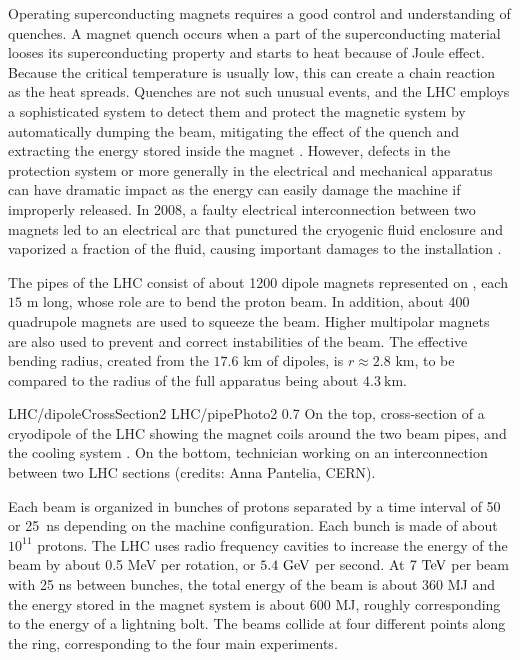     Operating superconducting magnets requires a good control and understanding
    of quenches.  A magnet quench occurs when a part of the superconducting
    material looses its superconducting property and starts to heat because of
    Joule effect. Because the critical temperature is usually low, this can
    create a chain reaction as the heat spreads. Quenches are not such unusual
    events, and the LHC employs a sophisticated system to detect them and
    protect the magnetic system by automatically dumping the beam, mitigating
    the effect of the quench and extracting the energy stored inside the magnet
    \cite{LHCmagnets}.  However, defects in the protection system or more
    generally in the electrical and mechanical apparatus can have dramatic
    impact as the energy can easily damage the machine if improperly released.
    In 2008, a faulty electrical interconnection between two magnets led to an
    electrical arc that punctured the cryogenic fluid enclosure and vaporized a
    fraction of the fluid, causing important damages to the installation
    \cite{LHCindicent}.

    The pipes of the LHC consist of about 1200 dipole magnets represented on
    , each $15$ m long, whose role are to bend the proton
    beam.  In addition, about 400 quadrupole magnets are used to squeeze the
    beam. Higher multipolar magnets are also used to prevent and correct
    instabilities of the beam. The effective bending radius, created from the
    $17.6$ km of dipoles, is $r \approx 2.8$ km, to be compared to the radius of
    the full apparatus being about $4.3~\text{km}$.

                     {LHC/dipoleCrossSection2}
                     {LHC/pipePhoto2}
                     {0.7}
                     {On the top, cross-section of a cryodipole of the LHC
                     showing the magnet coils around the two beam pipes, and the
                     cooling system \cite{LHC}.  On the bottom, technician
                     working on an interconnection between two LHC sections
                     (credits: Anna Pantelia, CERN).}

    Each beam is organized in bunches of protons separated by a time interval of
    50 or 25~ns depending on the machine configuration. Each bunch is made of
    about $10^{11}$ protons. The LHC uses radio frequency cavities to increase
    the energy of the beam by about 0.5 MeV per rotation, or $5.4~\text{GeV}$ per
    second. At $7~\text{TeV}$ per beam with 25 ns between bunches, the total energy of
    the beam is about 360 MJ and the energy stored in the magnet system is about
    600 MJ, roughly corresponding to the energy of a lightning bolt. The beams
    collide at four different points along the ring, corresponding to the four
    main experiments.

